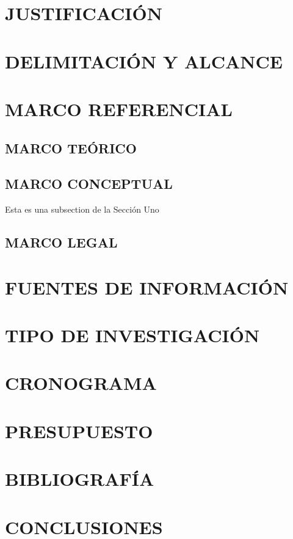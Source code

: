 \documentclass[stu,12pt,floatsintext]{apa7}
\begin{document}
	\section{JUSTIFICACIÓN}
	
	\section{DELIMITACIÓN Y ALCANCE}
	
	\section{MARCO REFERENCIAL}
	\subsection{MARCO TEÓRICO}
	\subsection{MARCO CONCEPTUAL}
	Esta es una subsection de la Sección Uno\cite{mittelbach2004latex}
	\subsection{MARCO LEGAL}
	
	\section{FUENTES DE INFORMACIÓN}
	
	\section{TIPO DE INVESTIGACIÓN}
	
	\section{CRONOGRAMA}
	
	\section{PRESUPUESTO}
	
	\section{BIBLIOGRAFÍA}
	\renewcommand\refname{Referencias}
	
	
	
	

	
	
	\section{CONCLUSIONES}
	
\end{document}
